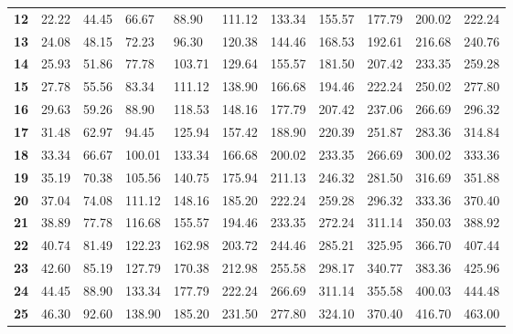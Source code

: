 \documentclass{article}
\begin{document}
\begin{table}[h]
\begin{tabular}{lllllllllll}
\textbf{12}      & 22.22      & 44.45      & 66.67      & 88.90      & 111.12     & 133.34     & 155.57     & 177.79     & 200.02     & 222.24      \\
\textbf{13}      & 24.08      & 48.15      & 72.23      & 96.30      & 120.38     & 144.46     & 168.53     & 192.61     & 216.68     & 240.76      \\
\textbf{14}      & 25.93      & 51.86      & 77.78      & 103.71     & 129.64     & 155.57     & 181.50     & 207.42     & 233.35     & 259.28      \\
\textbf{15}      & 27.78      & 55.56      & 83.34      & 111.12     & 138.90     & 166.68     & 194.46     & 222.24     & 250.02     & 277.80      \\
\textbf{16}      & 29.63      & 59.26      & 88.90      & 118.53     & 148.16     & 177.79     & 207.42     & 237.06     & 266.69     & 296.32      \\
\textbf{17}      & 31.48      & 62.97      & 94.45      & 125.94     & 157.42     & 188.90     & 220.39     & 251.87     & 283.36     & 314.84      \\
\textbf{18}      & 33.34      & 66.67      & 100.01     & 133.34     & 166.68     & 200.02     & 233.35     & 266.69     & 300.02     & 333.36      \\
\textbf{19}      & 35.19      & 70.38      & 105.56     & 140.75     & 175.94     & 211.13     & 246.32     & 281.50     & 316.69     & 351.88      \\
\textbf{20}      & 37.04      & 74.08      & 111.12     & 148.16     & 185.20     & 222.24     & 259.28     & 296.32     & 333.36     & 370.40      \\
\textbf{21}      & 38.89      & 77.78      & 116.68     & 155.57     & 194.46     & 233.35     & 272.24     & 311.14     & 350.03     & 388.92      \\
\textbf{22}      & 40.74      & 81.49      & 122.23     & 162.98     & 203.72     & 244.46     & 285.21     & 325.95     & 366.70     & 407.44      \\
\textbf{23}      & 42.60      & 85.19      & 127.79     & 170.38     & 212.98     & 255.58     & 298.17     & 340.77     & 383.36     & 425.96      \\
\textbf{24}      & 44.45      & 88.90      & 133.34     & 177.79     & 222.24     & 266.69     & 311.14     & 355.58     & 400.03     & 444.48      \\
\textbf{25}      & 46.30      & 92.60      & 138.90     & 185.20     & 231.50     & 277.80     & 324.10     & 370.40     & 416.70     & 463.00      \\

\end{tabular}
\end{table}
\end{document}
